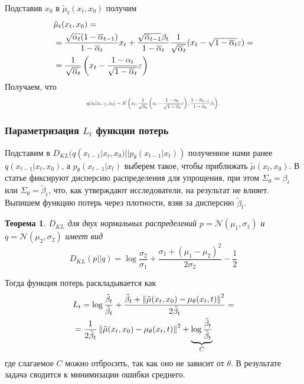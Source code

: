 \documentclass[11pt, a4paper, twocolumn, twoside]{article} %
\newtheorem{theorem}{Теорема}[section]
\begin{document}
Подставив $x_0$ в $\tilde\mu_t(x_t, x_0)$ получим
\begin{align*}
	& \tilde\mu_t(x_t, x_0) =\\
	& = \dfrac{\sqrt{\alpha_t}(1-\overline\alpha_{t-1})}{1-\overline\alpha_t}x_t + \dfrac{\sqrt{\overline\alpha_{t-1}}\beta_t}{1-\overline\alpha_t}\dfrac{1}{\sqrt{\overline\alpha_t}}(x_t - \sqrt{1-\overline\alpha_t}\varepsilon) = \\
	& = \dfrac{1}{\sqrt{\overline\alpha_t}}\left(x_t - \dfrac{1-\alpha_t}{\sqrt{1-\overline\alpha_t}}\varepsilon\right)
\end{align*}
Получаем, что 
\begin{equation}
	\resizebox{0.47\textwidth}{!}{$q(x_t|x_{t-1}, x_0) = \mathcal{N}\left(x_t; \dfrac{1}{\sqrt{\overline\alpha_t}}\left(x_t - \dfrac{1-\alpha_t}{\sqrt{1-\overline\alpha_t}}\eps\right), \dfrac{1 - \overline\alpha_{t-1}}{1 - \overline\alpha_t}\beta_t\right).$}
\end{equation}

\subsubsection{Параметризация $L_t$ функции потерь} 

Подставим в $D_{KL}(q(x_{t-1}| x_t, x_0)||p_\theta(x_{t-1}| x_t))$ полученное нами ранее $q(x_{t-1}| x_t, x_0)$, а $p_\theta(x_{t-1}| x_t)$ выберем такое, чтобы приближать $\tilde\mu(x_t, x_0)$. В статье \cite{Ho2020} фиксируют дисперсию распределения для упрощения, при этом $\Sigma_\theta = \beta_t$ или $\Sigma_\theta = \tilde\beta_t$, что, как утверждают исследователи, на результат не влияет. Выпишем функцию потерь через плотности, взяв за дисперсию $\tilde\beta_t$.
\begin{theorem}
	$D_{KL}$ для двух нормальных распределений $p=\mathcal{N}(\mu_1, \sigma_1)$ и $q=\mathcal{N}(\mu_2, \sigma_2)$ имеет вид
	\begin{equation*}
		D_{KL}(p||q) = \log\dfrac{\sigma_2}{\sigma_1}+\dfrac{\sigma_1 + (\mu_1 - \mu_2)^2}{2\sigma_2} - \dfrac{1}{2}
	\end{equation*}
\end{theorem}
Тогда функция потерь раскладывается как 
\begin{align*}
	& L_t = \log\dfrac{\tilde\beta_t}{\tilde\beta_t} + \dfrac{\tilde\beta_t + \left\Vert \tilde\mu(x_t,x_0) - \mu_\theta(x_t,t) \right\Vert^2}{2\tilde\beta_t} = \\
	& = \frac{1}{2\tilde\beta_t}\left\Vert \tilde\mu(x_t,x_0) - \mu_\theta(x_t,t) \right\Vert^2 + \underbrace{\log\dfrac{\tilde\beta_t}{\tilde\beta_t}}_{C}
\end{align*}
где слагаемое $C$ можно отбросить, так как оно не зависит от $\theta$. В результате задача сводится к минимизации ошибки среднего. 
\end{document}
